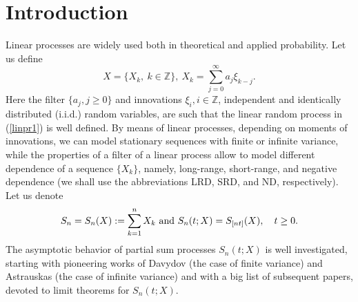 \documentclass[12pt]{article}
\def\bz{{\bf Z}}
\def\bz{{\mathbb Z}} %
\theoremstyle{plain}
\theoremstyle{definition}
\begin{document}
\section{Introduction }

Linear processes are widely used both in theoretical and applied probability. Let us define
\begin{equation}\label{linpr1}
X=\{X_k, \ k\in \bz \}, \ X_k=\sum_{j=0}^\infty a_j\xi_{k-j}.
\end{equation}
Here the filter $\{a_j, j\ge 0\}$ and innovations $\xi_i, i\in \bz$, independent and identically distributed (i.i.d.) random variables, are such that the linear random process in (\ref{linpr1}) is well defined.  By means of linear processes, depending on moments of innovations, we can model stationary sequences with finite or infinite variance, while the properties of a filter of a linear process allow to model different dependence of a sequence $\{X_k\}$, namely, long-range, short-range, and negative dependence (we shall use the abbreviations LRD, SRD, and ND, respectively). Let us denote
\begin{equation}\label{sum}
S_{n}=S_{n}(X):=\sum_{k=1}^{n} X_{k} \ {\rm and} \ S_{n}(t; X)=S_{[nt]}(X), \quad t\ge 0.
\end{equation}
The asymptotic behavior of partial sum processes $S_{n}(t; X)$ is well investigated,  starting with pioneering works  of Davydov \cite{dav1970} (the case of finite variance) and Astrauskas \cite{Astrauskas} (the case of infinite variance) and with a big list of subsequent papers, devoted to limit theorems for $S_{n}(t; X)$.
\end{document}
